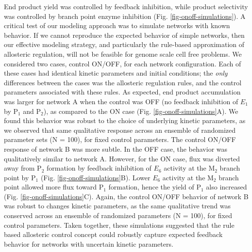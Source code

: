 \documentclass[12pt]{article}
\begin{document}
End product yield was controlled by feedback inhibition, while product selectivity was controlled by branch point enzyme inhibition (Fig. \ref{fig-onoff-simulations}).
A critical test of our modeling approach was to simulate networks with known behavior. If we cannot reproduce the expected behavior of simple networks, then our
effective modeling strategy, and particularly the rule-based approximation of allosteric regulation, will not be feasible for genome scale cell free problems.
We considered two cases,  control ON/OFF, for each network configuration. 
Each of these cases had identical kinetic parameters and initial conditions; 
the \textit{only} differences between the cases was the allosteric regulation rules, and the control parameters associated with these rules. 
As expected, end product accumulation was larger for network A when the control was OFF (no feedback inhibition of $E_{1}$ by P$_{1}$ and P$_{2}$),
as compared to the ON case (Fig. \ref{fig-onoff-simulations}A). We found this behavior was robust to the choice of underlying kinetic parameters, 
as we observed that same qualitative response across an ensemble of randomized parameter sets (N = 100), for fixed control parameters.
The control ON/OFF response of network B was more subtle. In the OFF case, the behavior was qualitatively similar to network A. 
However, for the ON case, flux was diverted away from P$_{2}$ formation by feedback inhibition of $E_{6}$ activity at the M$_{2}$ branch point by P$_{1}$ (Fig. \ref{fig-onoff-simulations}B).
Lower $E_{6}$ activity at the M$_{2}$ branch point allowed more flux toward P$_{1}$ formation, hence the yield of P$_{1}$ also increased (Fig. \ref{fig-onoff-simulations}C).
Again, the control ON/OFF behavior of network B was robust to changes kinetic parameters, as the same qualitative trend was conserved across 
an ensemble of randomized parameters (N = 100), for fixed control parameters. 
Taken together, these simulations suggested that the rule based allosteric control concept could robustly capture expected feedback behavior for networks with uncertain
kinetic parameters.
\end{document}
